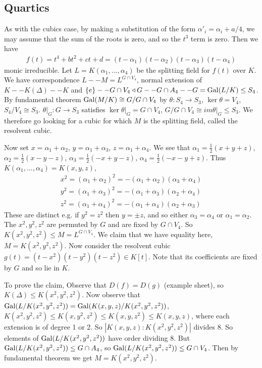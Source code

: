 \documentclass[a4paper]{article}
\begin{document}
\subsection{Quartics}
As with the cubics case, by making a substitution of the form $\alpha'_i = \alpha_i + a/4$, we may assume that the sum of the roots is zero, and so the $t^3$ term is zero. Then we have
\begin{equation*}
\begin{aligned}
f(t) = t^4+bt^2+ct+d = (t-\alpha_1)(t-\alpha_2)(t-\alpha_3)(t-\alpha_4)
\end{aligned}
\end{equation*}
monic irreducible. Let $L = K(\alpha_1,...,\alpha_4)$ be the splitting field for $f(t)$ over $K$. We have correspondence $L -- M =L^{G \cap V_4}$, normal extension of $K -- K(\Delta) -- K$ and $\{e\} -- G \cap V_4 \triangleleft G -- G\cap A_4 -- G = \operatorname{Gal}(L/K) \leq S_4$. By fundamental theorem $\operatorname{Gal}(M/K) \cong G/G\cap V_4$ by $\theta :S_4 \to S_3$, $\ker \theta = V_4$, $S_4/ V_4 \cong S_3$. $\theta|_G : G \to S_3$ satisfies $\ker \theta|_G = G\cap V_4$, $G/G\cap V_4 \cong im \theta|_G \leq S_3$. We therefore go looking for a cubic for which $M$ is the splitting field, called the resolvent cubic.

Now set $x = \alpha_1+\alpha_2$, $y=\alpha_1+\alpha_3$, $z=\alpha_1+\alpha_4$. We see that $\alpha_1 = \frac{1}{2}(x+y+z)$, $\alpha_2 = \frac{1}{2}(x-y-z)$, $\alpha_3 =\frac{1}{2}(-x+y-z)$, $\alpha_4 = \frac{1}{2}(-x-y+z)$. Thus $K(\alpha_1,...,\alpha_4) = K(x,y,z)$,
\begin{equation*}
\begin{aligned}
x^2 = (\alpha_1+\alpha_2)^2 = -(\alpha_1+\alpha_2)(\alpha_3+\alpha_4)\\
y^2 = (\alpha_1+\alpha_3)^2 = -(\alpha_1+\alpha_3)(\alpha_2+\alpha_4)\\
z^2 = (\alpha_1+\alpha_4)^2 = -(\alpha_1+\alpha_4)(\alpha_2+\alpha_3)
\end{aligned}
\end{equation*}
These are distinct e.g. if $y^2=z^2$ then $y = \pm z$, and so either $\alpha_3 = \alpha_4$ or $\alpha_1 = \alpha_2$. The $x^2,y^2,z^2$ are permuted by $G$ and are fixed by $G \cap V_4$. So $K(x^2,y^2,z^2) \leq M = L^{G \cap V_4}$. We claim that we have equality here, $M = K(x^2,y^2,z^2)$. Now consider the resolvent cubic $g(t) = (t-x^2)(t-y^2)(t-z^2) \in K[t]$. Note that its coefficients are fixed by $G$ and so lie in $K$.

To prove the claim, Observe that $D(f) = D(g)$ (example sheet), so $K(\Delta) \leq K(x^2,y^2,z^2)$. Now observe that $\operatorname{Gal}(L/K(x^2,y^2,z^2)) = \operatorname{Gal}(K(x,y,z)/K(x^2,y^2,z^2))$, $K(x^2,y^2,z^2) \leq K(x,y^2,z^2) \leq K(x,y,z^2) \leq K(x,y,z)$, where each extension is of degree 1 or 2. So $|K(x,y,z):K(x^2,y^2,z^2)|$ divides 8. So elements of $\operatorname{Gal}(L/K(x^2,y^2,z^2))$ have order dividing 8. But $\operatorname{Gal}(L/K(x^2,y^2,z^2)) \leq G \cap A_4$, so $\operatorname{Gal}(L/K(x^2,y^2,z^2)) \leq G \cap V_4$. Then by fundamental theorem we get $M = K(x^2,y^2,z^2)$.
\end{document}
